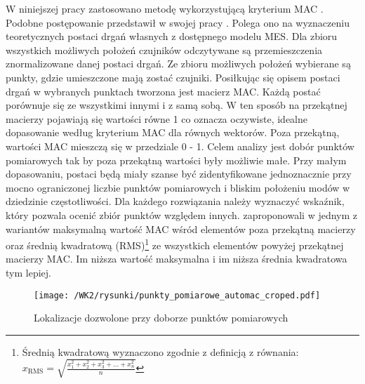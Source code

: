 W niniejszej pracy zastosowano metodę wykorzystującą kryterium MAC \parencite{Penny1994}. Podobne postępowanie przedstawił w swojej pracy \cite{Poprawa2018}. Polega ono na wyznaczeniu teoretycznych postaci drgań własnych z dostępnego modelu MES. Dla zbioru wszystkich możliwych położeń czujników odczytywane są przemieszczenia znormalizowane danej postaci drgań. Ze zbioru możliwych położeń wybierane są punkty, gdzie umieszczone mają zostać czujniki. Posiłkując się opisem postaci drgań w wybranych punktach tworzona jest macierz MAC. Każdą postać porównuje się ze wszystkimi innymi i z samą sobą. W ten sposób na przekątnej macierzy pojawiają się wartości równe 1 co oznacza oczywiste, idealne dopasowanie według kryterium MAC dla równych wektorów. Poza przekątną, wartości MAC mieszczą się w przedziale 0 - 1. Celem analizy jest dobór punktów pomiarowych tak by poza przekątną wartości były możliwie małe. Przy małym dopasowaniu, postaci będą miały szanse być zidentyfikowane jednoznacznie przy mocno ograniczonej liczbie punktów pomiarowych i bliskim położeniu modów w dziedzinie częstotliwości. Dla każdego rozwiązania należy wyznaczyć wskaźnik, który pozwala ocenić zbiór punktów względem innych. \cite{Penny1994} zaproponowali w jednym z wariantów maksymalną wartość MAC wśród elementów poza przekątną macierzy oraz średnią kwadratową (RMS)\footnote{Średnią kwadratową wyznaczono zgodnie z definicją z równania: $x_{\text{RMS}}=\sqrt{\frac{x_1^2+x_2^2+x_3^2+\dots+x_n^2}{n}}$} ze wszystkich elementów powyżej przekątnej macierzy MAC. Im niższa wartość maksymalna i im niższa średnia kwadratowa tym lepiej.
\begin{figure}[t]
	\centering
	\texttt{[image: /WK2/rysunki/punkty\_pomiarowe\_automac\_croped.pdf]}
	\captionsetup{justification=centering}
	\caption{Lokalizacje dozwolone przy doborze punktów pomiarowych}
	\label{fig: wk2_automac_points_all}
\end{figure}

